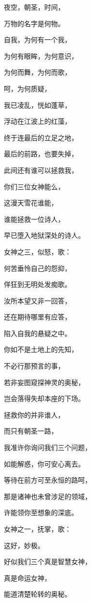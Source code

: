 \documentclass[UTF8]{article}
\begin{document}
\par 夜空，朝圣，时间，
\par 万物的名字是何物。
\par 自我，为何有一个我，
\par 为何有眼眸，为何意识，
\par 为何而舞，为何而歌，
\par 呵，为何质疑，
\par 我已凌乱，恍如蓬草，
\par 浮动在江波上的红藻，
\par 终于连最后的立足之地，
\par 最后的前路，也要失掉，
\par 此间还有谁可以拯救我，
\par 你们三位女神能么，
\par 这漫天雪花谁能，
\par 谁能拯救一位诗人，
\par 早已堕入地狱深处的诗人。
\\[0.6cm]
\par 女神之三，似怒，歌：
\\[0.6cm]
\par 何苦垂怜自己的怨抑，
\par 佯狂到无明处发痴歌。
\par 汝所本望又非一回答，
\par 还在期待哪里有应答，
\par 陷入自我的悬疑之中。
\par 你如不是土地上的先知，
\par 不必行那预言的事，
\par 若非妄图窥探神灵的奥秘，
\par 岂会落得失却本座的下场。
\par 拯救你的并非谁人，
\par 而只有朝圣一路，
\par 我准许你询问我们三个问题，
\par 如能解惑，你可安心离去。
\par 等待在前方可至永恒的路呵，
\par 那是诸神也未曾涉足的领域，
\par 许能领你至想象的深底。
\\[0.6cm]
\par 女神之一，抚掌，歌：
\\[0.6cm]
\par 这好，妙极。
\par 好似我们三个真是智慧女神，
\par 真是命运女神，
\par 能道清楚轮转的奥秘。
\end{document}
